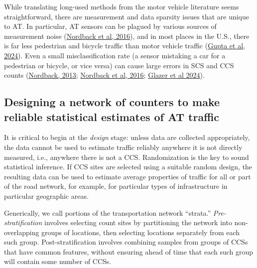 \documentclass[11pt]{article}
\begin{document}
While translating long-used methods from the motor vehicle literature
seems straightforward, there are measurement and data sparsity issues
that are unique to AT. In particular, AT sensors can be plagued by
various sources of measurement noise
(\href{https://www.oregon.gov/odot/Programs/ResearchDocuments/SPR772_Bicycle_PedestrianTechnologies.pdf}{Nordback
et al, 2016}), and in most places in the U.S., there is far less
pedestrian and bicycle traffic than motor vehicle traffic
(\href{https://arxiv.org/abs/2410.08522}{Gupta et al, 2024}). Even a
small misclassification rate (a sensor mistaking a car for a pedestrian
or bicycle, or vice versa) can cause large errors in SCS and CCS counts
(\href{https://trec.pdx.edu/sites/default/files/smol-IBPI\%20Guide\%20to\%20Bicycle\%20\%26\%20Pedestrian\%20Count\%20Programs_final.pdf}{Nordback,
2013};
\href{https://www.oregon.gov/odot/Programs/ResearchDocuments/SPR772_Bicycle_PedestrianTechnologies.pdf}{Nordback
et al, 2016};
\href{https://www.researchgate.net/publication/377362665_DATA_CHECKS_FOR_BICYCLE_AND_PEDESTRIAN_COUNTS}{Glazer
et al 2024}).

    \subsection{Designing a network of counters to make reliable statistical
estimates of AT
traffic}\label{designing-a-network-of-counters-to-make-reliable-statistical-estimates-of-at-traffic}

It is critical to begin at the \emph{design} stage: unless data are
collected appropriately, the data cannot be used to estimate traffic
reliably anywhere it is not directly measured, i.e., anywhere there is
not a CCS. Randomization is the key to sound statistical inference. If
CCS sites are selected using a suitable random design, the resulting
data can be used to estimate average properties of traffic for all or
part of the road network, for example, for particular types of
infrastructure in particular geographic areas.

Generically, we call portions of the transportation network ``strata.''
\emph{Pre-stratification} involves selecting count sites by partitioning
the network into non-overlapping groups of locations, then selecting
locations separately from each such group. Post-stratification involves
combining samples from groups of CCSs that have common features, without
ensuring ahead of time that each such group will contain some number of
CCSs.
\end{document}
